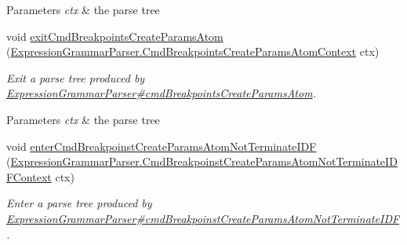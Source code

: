 \begin{DoxyCompactItemize}
\begin{DoxyCompactList}
\begin{DoxyParams}{Parameters}
{\em ctx} & the parse tree\\
\hline
\end{DoxyParams}
 \end{DoxyCompactList}\item 
void \hyperlink{classgov_1_1nasa_1_1jpf_1_1inspector_1_1server_1_1expression_1_1parser_1_1_expression_grammar_base_listener_a45c9150d7bf895d40ca534f4a121108f}{exit\+Cmd\+Breakpoints\+Create\+Params\+Atom} (\hyperlink{classgov_1_1nasa_1_1jpf_1_1inspector_1_1server_1_1expression_1_1parser_1_1_expression_grammar_paa3acc222754f42ff002c5d98d8d38136}{Expression\+Grammar\+Parser.\+Cmd\+Breakpoints\+Create\+Params\+Atom\+Context} ctx)
\begin{DoxyCompactList}\small\item\em Exit a parse tree produced by \hyperlink{classgov_1_1nasa_1_1jpf_1_1inspector_1_1server_1_1expression_1_1parser_1_1_expression_grammar_parser_af5febf5689be29b485c8497738ef35fc}{Expression\+Grammar\+Parser\#cmd\+Breakpoints\+Create\+Params\+Atom}.


\begin{DoxyParams}{Parameters}
{\em ctx} & the parse tree\\
\hline
\end{DoxyParams}
 \end{DoxyCompactList}\item 
void \hyperlink{classgov_1_1nasa_1_1jpf_1_1inspector_1_1server_1_1expression_1_1parser_1_1_expression_grammar_base_listener_a970fe1e519a60a56d8652f0faaccc218}{enter\+Cmd\+Breakpoinst\+Create\+Params\+Atom\+Not\+Terminate\+I\+DF} (\hyperlink{classgov_1_1nasa_1_1jpf_1_1inspector_1_1server_1_1expression_1_1parser_1_1_expression_grammar_paee196826319d0ea00470866a7ffd8d7b}{Expression\+Grammar\+Parser.\+Cmd\+Breakpoinst\+Create\+Params\+Atom\+Not\+Terminate\+I\+D\+F\+Context} ctx)
\begin{DoxyCompactList}\small\item\em Enter a parse tree produced by \hyperlink{classgov_1_1nasa_1_1jpf_1_1inspector_1_1server_1_1expression_1_1parser_1_1_expression_grammar_parser_a877ec76515f792b811174f247de762a6}{Expression\+Grammar\+Parser\#cmd\+Breakpoinst\+Create\+Params\+Atom\+Not\+Terminate\+I\+DF}.



\end{DoxyCompactList}
\end{DoxyCompactItemize}
